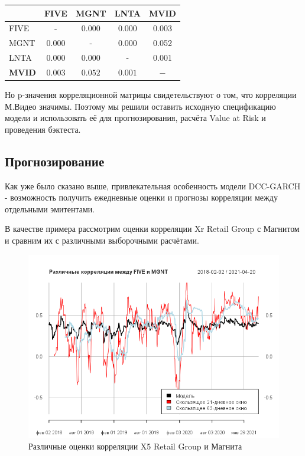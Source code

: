 \documentclass[a4paper,12pt,twoside]{article}
\begin{document}
\begin{table}[htbp]
  \centering
    \begin{tabular}{lcccc}
      \hline
          & FIVE  & MGNT  & LNTA  & MVID \\
      \hline
    FIVE  & -     & 0.000 & 0.000 & 0.003 \\
    MGNT  & 0.000 & -     & 0.000 & 0.052 \\
    LNTA  & 0.000 & 0.000 & -     & 0.001 \\
    $\mathbf{MVID}$ & $\mathbf{0.003}$ & $\mathbf{0.052}$ & $\mathbf{0.001}$ & $\mathbf{-}$ \\
    \hline
    \end{tabular}%
  \label{tab:addlabel}%
\end{table}%

Но p-значения корреляционной матрицы свидетельствуют о том, что корреляции М.Видео значимы. Поэтому мы решили оставить исходную спецификацию модели и использовать её для прогнозирования, расчёта Value at Risk и проведения бэктеста.

\subsection{Прогнозирование}\label{forecasting}

Как уже было сказано выше, привлекательная особенность модели DCC-GARCH - возможность получить ежедневные оценки и прогнозы корреляции между отдельными эмитентами.

В качестве примера рассмотрим оценки корреляции Xr Retail Group с Магнитом и сравним их с различными выборочными расчётами.

\begin{center}
  \begin{figure}[h]
      \includegraphics[scale = 0.5]{dcc_five_corrs.png}
      \caption{Различные оценки корреляции X5 Retail Group и Магнита}
      \label{fig:five_mgnt_corrs}
  \end{figure}
\end{center}
\end{document}
